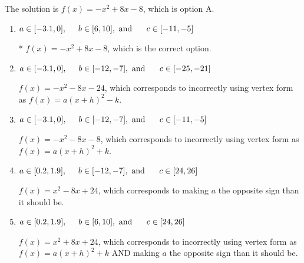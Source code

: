 \documentclass{extbook}[14pt]
\begin{document}
\begin{enumerate}
{The solution is \( f(x) = -x^{2} +8 x -8 \), which is option A.\begin{enumerate}[label=\Alph*.]
\item \( a \in [-3.1, 0], \hspace*{5mm} b \in [6, 10], \text{ and } \hspace*{5mm} c \in [-11, -5] \)

* $f(x)=-x^{2} +8 x -8$, which is the correct option.
\item \( a \in [-3.1, 0], \hspace*{5mm} b \in [-12, -7], \text{ and } \hspace*{5mm} c \in [-25, -21] \)

$f(x)=-x^{2} -8 x -24$, which corresponds to incorrectly using vertex form as $f(x) = a(x+h)^2 - k$.
\item \( a \in [-3.1, 0], \hspace*{5mm} b \in [-12, -7], \text{ and } \hspace*{5mm} c \in [-11, -5] \)

$f(x)=-x^{2} -8 x -8$, which corresponds to incorrectly using vertex form as $f(x) = a(x+h)^2+k$.
\item \( a \in [0.2, 1.9], \hspace*{5mm} b \in [-12, -7], \text{ and } \hspace*{5mm} c \in [24, 26] \)

$f(x)=x^{2} -8 x + 24$, which corresponds to making $a$ the opposite sign than it should be.
\item \( a \in [0.2, 1.9], \hspace*{5mm} b \in [6, 10], \text{ and } \hspace*{5mm} c \in [24, 26] \)

$f(x)=x^{2} +8 x + 24$, which corresponds to incorrectly using vertex form as $f(x) = a(x+h)^2+k$ AND making $a$ the opposite sign than it should be.
\end{enumerate}

}
\end{enumerate}
\end{document}
